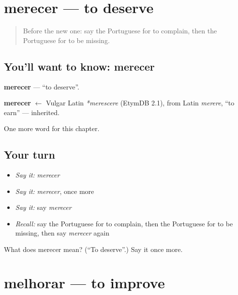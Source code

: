\section[merecer]{merecer — to deserve}

\label{lesson:PT-C175-merecer}



\begin{quote}
Before the new one: say the Portuguese for to complain, then the Portuguese for to be missing.
\end{quote}

\subsection*{You'll want to know: merecer}
\textbf{merecer} — \textquotedblleft{}to deserve\textquotedblright{}.

\begin{cousinweb}
\textbf{merecer} $\leftarrow$ Vulgar Latin \emph{*merescere} (EtymDB 2.1), from Latin \emph{merere}, \textquotedblleft{}to earn\textquotedblright{} — inherited.
\end{cousinweb}

\begin{grammarlens}[title={What you've built}]
One more word for this chapter.
\end{grammarlens}

\subsection*{Your turn}
\begin{itemize}
\raggedright
  \item \emph{Say it:} \emph{merecer}
  \item \emph{Say it:} \emph{merecer}, once more
  \item \emph{Say it:} say \emph{merecer}
  \item \emph{Recall:} say the Portuguese for to complain, then the Portuguese for to be missing, then say \emph{merecer} again
\end{itemize}

\begin{tcolorbox}[breakable,colback=teal!4,colframe=teal!35!black,title={Before you move on}]
What does merecer mean? (\textquotedblleft{}To deserve\textquotedblright{}.) Say it once more.
\end{tcolorbox}
\section[melhorar]{melhorar — to improve}

